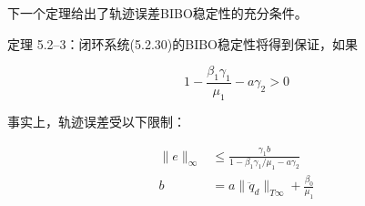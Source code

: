 \documentclass[UTF8,12pt,a4paper]{ctexart}
\begin{document}
下一个定理给出了轨迹误差BIBO稳定性的充分条件。

\begin{theorem}\label{thm:5.2.3}
定理 5.2--3：闭环系统(5.2.30)的BIBO稳定性将得到保证，如果

\begin{equation}
1 - \frac{\beta_1\gamma_1}{\mu_1} - a\gamma_2 > 0
\end{equation}

事实上，轨迹误差受以下限制：

\begin{align}
\|e\|_\infty &\leq \frac{\gamma_1 b}{1 - \beta_1\gamma_1/\mu_1 - a\gamma_2} \\
b &= a\|\ddot{q}_d\|_{T\infty} + \frac{\beta_0}{\mu_1}
\end{align}
\end{theorem}
\end{document}
